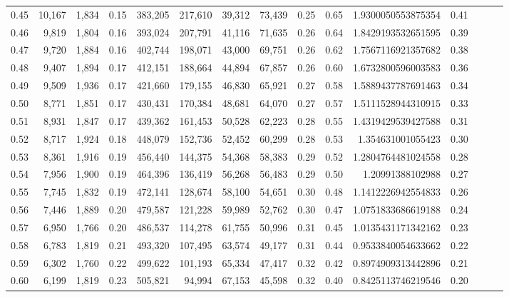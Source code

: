 \begin{tabular}{rrrrrrrrrrrrrrr}
0.45 &  10,167 &  1,834 &  0.15 &  383,205 &  217,610 &   39,312 &   73,439 &  0.25 &  0.65 &    1.9300050553875354 &      0.41 \\
0.46 &   9,819 &  1,804 &  0.16 &  393,024 &  207,791 &   41,116 &   71,635 &  0.26 &  0.64 &    1.8429193532651595 &      0.39 \\
0.47 &   9,720 &  1,884 &  0.16 &  402,744 &  198,071 &   43,000 &   69,751 &  0.26 &  0.62 &    1.7567116921357682 &      0.38 \\
0.48 &   9,407 &  1,894 &  0.17 &  412,151 &  188,664 &   44,894 &   67,857 &  0.26 &  0.60 &    1.6732800596003583 &      0.36 \\
0.49 &   9,509 &  1,936 &  0.17 &  421,660 &  179,155 &   46,830 &   65,921 &  0.27 &  0.58 &    1.5889437787691463 &      0.34 \\
0.50 &   8,771 &  1,851 &  0.17 &  430,431 &  170,384 &   48,681 &   64,070 &  0.27 &  0.57 &    1.5111528944310915 &      0.33 \\
0.51 &   8,931 &  1,847 &  0.17 &  439,362 &  161,453 &   50,528 &   62,223 &  0.28 &  0.55 &    1.4319429539427588 &      0.31 \\
0.52 &   8,717 &  1,924 &  0.18 &  448,079 &  152,736 &   52,452 &   60,299 &  0.28 &  0.53 &     1.354631001055423 &      0.30 \\
0.53 &   8,361 &  1,916 &  0.19 &  456,440 &  144,375 &   54,368 &   58,383 &  0.29 &  0.52 &    1.2804764481024558 &      0.28 \\
0.54 &   7,956 &  1,900 &  0.19 &  464,396 &  136,419 &   56,268 &   56,483 &  0.29 &  0.50 &      1.20991388102988 &      0.27 \\
0.55 &   7,745 &  1,832 &  0.19 &  472,141 &  128,674 &   58,100 &   54,651 &  0.30 &  0.48 &    1.1412226942554833 &      0.26 \\
0.56 &   7,446 &  1,889 &  0.20 &  479,587 &  121,228 &   59,989 &   52,762 &  0.30 &  0.47 &    1.0751833686619188 &      0.24 \\
0.57 &   6,950 &  1,766 &  0.20 &  486,537 &  114,278 &   61,755 &   50,996 &  0.31 &  0.45 &    1.0135431171342162 &      0.23 \\
0.58 &   6,783 &  1,819 &  0.21 &  493,320 &  107,495 &   63,574 &   49,177 &  0.31 &  0.44 &    0.9533840054633662 &      0.22 \\
0.59 &   6,302 &  1,760 &  0.22 &  499,622 &  101,193 &   65,334 &   47,417 &  0.32 &  0.42 &    0.8974909313442896 &      0.21 \\
0.60 &   6,199 &  1,819 &  0.23 &  505,821 &   94,994 &   67,153 &   45,598 &  0.32 &  0.40 &    0.8425113746219546 &      0.20 \\

\end{tabular}
